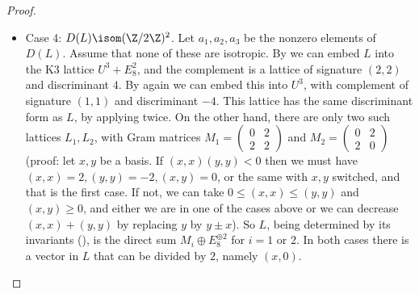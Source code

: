 \documentclass{article}
\begin{document}
\begin{proof}
\begin{itemize}
  \item{Case 4: $D(L)\isom (\Z/2\Z)^2$.}  Let $a_1,a_2,a_3$ be the nonzero elements of $D(L)$.  Assume that none of these are isotropic.
      By \cite[Theorem 2.8]{morr} we can embed $L$ into the K3 lattice
      $U^3 + E_8^2$, and the complement is a lattice of signature $(2,2)$ and
      discriminant $4$.  By \cite[Theorem 2.8]{morr} again we can embed
      this into $U^3$, with complement of signature $(1,1)$ and discriminant
      $-4$.  This lattice has the same discriminant form as $L$, by
      applying \cite[Lemma 2.4]{morr} twice.  On the other hand, there are
      only two such lattices $L_1, L_2$, with Gram matrices
      $M_1 = \begin{pmatrix} 0&2\\2&2 \end{pmatrix}$ and
      $M_2 = \begin{pmatrix} 0&2\\2&0 \end{pmatrix}$
      (proof: let $x, y$ be a basis.
      If $(x,x)(y,y) < 0$ then we must have $(x,x) = 2, (y,y) = -2, (x,y) = 0$,
      or the same with $x, y$ switched, and that is the first case.  If not,
      we can take $0 \le (x,x) \le (y,y)$ and $(x,y) \ge 0$, and either we
      are in one of the cases above or we can decrease $(x,x) + (y,y)$ by
      replacing $y$ by $y \pm x$). 
       So $L$, being determined
      by its invariants (\cite[Theorem 2.2]{morr}), is the direct sum
      $M_i \oplus  E_8^{\oplus 2}$ for $i = 1$ or $2$.  In both cases there is a vector in
      $L$ that can be divided by $2$, namely $(x,0)$.
  \end{itemize}
\end{proof}
\end{document}

